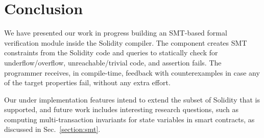 \section{Conclusion}
\label{section:conclusion}
We have presented our work in progress building an SMT-based formal
verification module inside the Solidity compiler.
%
The component creates SMT constraints from the Solidity code and queries to
statically check for underflow/overflow, unreachable/trivial code, and
assertion fails.
%
The programmer receives, in compile-time, feedback with counterexamples in case
any of the target properties fail, without any extra effort.

Our under implementation features intend to extend the subset of Solidity that
is supported, and future work includes interesting research questions, such as
computing multi-transaction invariants for state variables in smart contracts,
as discussed in Sec.~\ref{section:smt}.

